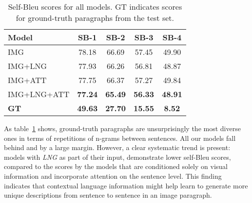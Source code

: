 \documentclass[11pt,a4paper]{article}
\begin{document}
\begin{table}[h]
    \footnotesize
    \centering
    \begin{tabular}{|l|c|c|c|c|}
    \hline
       \textbf{Model}  &  \textbf{SB-1} & \textbf{SB-2} & \textbf{SB-3} & \textbf{SB-4} \\
    \hline
      IMG   & 78.18 & 66.69 & 57.45 & 49.90 \\
    \hline
      IMG+LNG   & 77.93 & 66.26 & 56.81 & 48.87 \\
    \hline
      IMG+ATT   & 77.75 & 66.37 & 57.27 & 49.84 \\
    \hline
      IMG+LNG+ATT   & \textbf{77.24} & \textbf{65.49} & \textbf{56.33} & \textbf{48.91} \\
    \hline
    \hline
      \textbf{GT}   & \textbf{49.63} & \textbf{27.70} & \textbf{15.55} & \textbf{8.52} \\
     \hline
    \end{tabular}
    \caption{Self-Bleu scores for all models. GT indicates scores for ground-truth paragraphs from the test set.}
    \label{tab:self_bleu}
\end{table}

As table~\ref{tab:self_bleu} shows, ground-truth paragraphs are unsurprisingly the most diverse ones in terms of repetitions of n-grams between sentences.
All our models fall behind and by a large margin.
However, a clear systematic trend is present: models with \textit{LNG} as part of their input, demonstrate lower self-Bleu scores, compared to the scores by the models that are conditioned solely on visual information and incorporate attention on the sentence level.
This finding indicates that contextual language information might help learn to generate more unique descriptions from sentence to sentence in an image paragraph.



\end{document}
